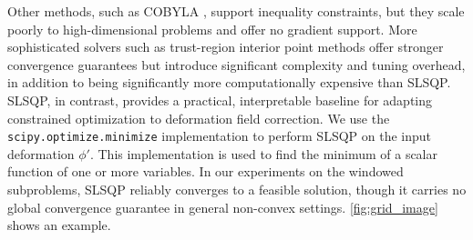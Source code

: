 \documentclass[lettersize,journal]{IEEEtran}
\begin{document}
Other methods, such as COBYLA \cite{Powell1994}, support inequality constraints, but they scale poorly to high-dimensional problems and offer no gradient support. More sophisticated solvers such as trust-region interior point methods \cite{Byrd2000} offer stronger convergence guarantees but introduce significant complexity and tuning overhead, in addition to being significantly more computationally expensive than SLSQP. SLSQP, in contrast, provides a practical, interpretable baseline for adapting constrained optimization to deformation field correction. We use the \texttt{scipy.optimize.minimize} implementation \cite{SciPySLSQPDoc} to perform SLSQP on the input deformation $\phi'$. This implementation is used to find the minimum of a scalar function of one or more variables. In our experiments on the windowed subproblems, SLSQP reliably converges to a feasible solution, though it carries no global convergence guarantee in general non-convex settings. \autoref{fig:grid_image} shows an example.

\end{document}
